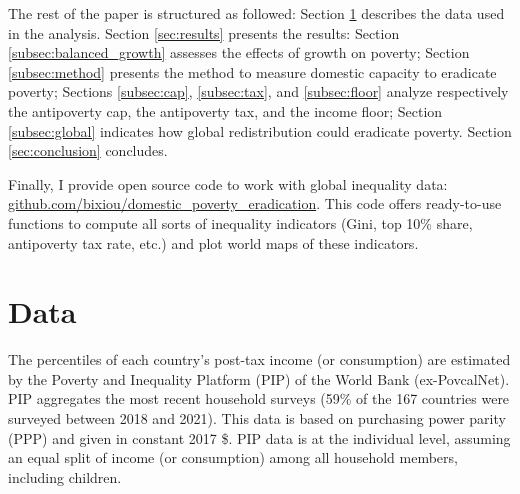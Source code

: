 The rest of the paper is structured as followed: Section \ref{subsec:data} describes the data used in the analysis. Section \ref{sec:results} presents the results: Section \ref{subsec:balanced_growth} assesses the effects of growth on poverty; Section \ref{subsec:method} presents the method to measure domestic capacity to eradicate poverty; Sections \ref{subsec:cap}, \ref{subsec:tax}, and \ref{subsec:floor} analyze respectively the antipoverty cap, the antipoverty tax, and the income floor; Section \ref{subsec:global} indicates how global redistribution could eradicate poverty. Section \ref{sec:conclusion} concludes. 

Finally, I provide open source code to work with global inequality data: \href{https://github.com/bixiou/domestic_poverty_eradication}{github.com/bixiou/domestic\_poverty\_eradication}. This code offers ready-to-use functions to compute all sorts of inequality indicators (Gini, top 10\% share, antipoverty tax rate, etc.) and plot world maps of these indicators.

\section{Data}\label{subsec:data}
The percentiles of each country's post-tax income (or consumption) are estimated by the Poverty and Inequality Platform (PIP) of the World Bank (ex-PovcalNet). PIP aggregates the most recent household surveys (59\% of the 167 countries were surveyed between 2018 and 2021). This data is based on purchasing power parity (PPP) and given in constant 2017 \$. PIP data is %
at the individual level, assuming an equal split of income (or consumption) among all household members, including children. %

